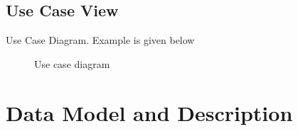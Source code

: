 \documentclass[oneside,a4paper,12pt]{report}
\begin{document}
\subsection{Use Case View}
Use Case Diagram. Example is given below
\begin{center}
	\begin{figure}[H]
		\centering
	  \caption{Use case diagram}
	  \label{fig:usecase}
	\end{figure}
\end{center}  

\section{Data Model and Description}  
\end{document}
